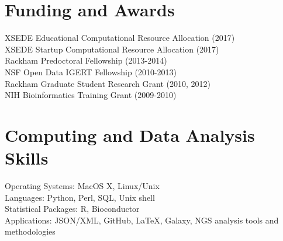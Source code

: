 \documentclass[margin,line]{res}
\begin{document}
\begin{resume}


\section{\sc Funding and Awards} 
{XSEDE Educational Computational Resource Allocation (2017)}\\
{XSEDE Startup Computational Resource Allocation (2017)}\\
{Rackham Predoctoral Fellowship (2013-2014)}\\
{NSF Open Data IGERT Fellowship (2010-2013)}\\
{Rackham Graduate Student Research Grant (2010, 2012)}\\
{NIH Bioinformatics Training Grant (2009-2010)}\\


\section{\sc Computing and Data Analysis Skills} 
Operating Systems: MacOS X, Linux/Unix \\
Languages: Python, Perl, SQL, Unix shell \\
Statistical Packages: R, Bioconductor \\
Applications: JSON/XML, GitHub, \LaTeX, Galaxy, NGS analysis tools and methodologies\\


\end{resume}
\end{document}
